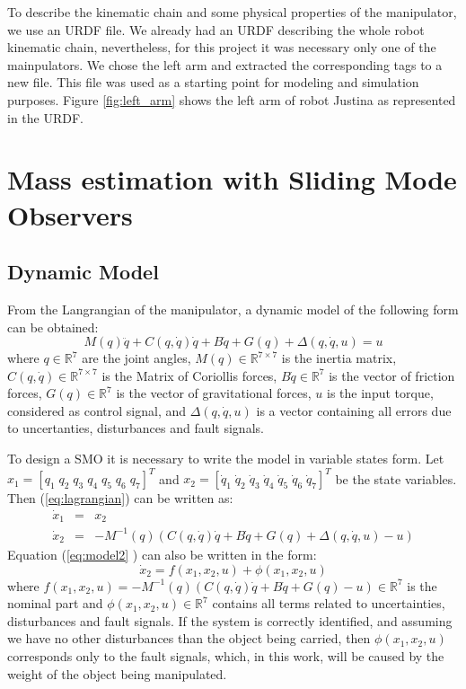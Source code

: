 \documentclass[a4paper, 10pt]{article}
\begin{document}
To describe the kinematic chain and some physical properties of the manipulator, we use an URDF file. We already had an URDF describing the whole robot kinematic chain, nevertheless, for this project it was necessary only one of the mainpulators. We chose the left arm and extracted the corresponding tags to a new file. This file was used as a starting point for modeling and simulation purposes. Figure \ref{fig:left_arm} shows the left arm of robot Justina as represented in the URDF.

\section{Mass estimation with Sliding Mode Observers}

\subsection{Dynamic Model}
  From the Langrangian of the manipulator, a dynamic model of the following form can be obtained:
  \begin{equation}
    M(q)\ddot{q} + C(q, \dot{q})\dot{q} + B\dot{q} + G(q) + \Delta(q,\dot{q}, u) = u
    \label{eq:lagrangian}
  \end{equation}
  where $q\in \mathbb{R}^7$ are the joint angles, $M(q)\in \mathbb{R}^{7\times 7}$ is the inertia matrix, $C(q,\dot{q})\in \mathbb{R}^{7\times 7}$ is the Matrix of Coriollis forces, $B\dot{q}\in \mathbb{R}^7$ is the vector of friction forces, $G(q)\in\mathbb{R}^7$ is the vector of gravitational forces, $u$ is the input torque, considered as control signal, and $\Delta(q,\dot{q},u)$ is a vector containing all errors due to uncertanties, disturbances and fault signals.
  
  To design a SMO it is necessary to write the model in variable states form. Let $x_1 = [q_1\;q_2\;q_3\;q_4\;q_5\;q_6\;q_7]^T$ and $x_2 = [\dot{q}_1\;\dot{q}_2\;\dot{q}_3\;\dot{q}_4\;\dot{q}_5\;\dot{q}_6\;\dot{q}_7]^T$ be the state variables. Then (\ref{eq:lagrangian}) can be written as:
  \begin{eqnarray}
    \dot{x}_1 &=& x_2\label{eq:model1}\\
    \dot{x}_2 &=& -M^{-1}(q)\left(C(q, \dot{q})\dot{q} + B\dot{q} + G(q) + \Delta(q,\dot{q},u) - u\right)\label{eq:model2}
  \end{eqnarray}
Equation (\ref{eq:model2} ) can also be written in the form:
  \begin{equation*}
    \dot{x}_2 = f(x_1, x_2, u) + \phi(x_1, x_2, u)
  \end{equation*}
  where $f(x_1, x_2, u) = -M^{-1}(q)\left(C(q, \dot{q})\dot{q} + B\dot{q} + G(q) - u\right) \in \mathbb{R}^7$ is the nominal part and $\phi(x_1, x_2, u) \in \mathbb{R}^7$ contains all terms related to uncertainties, disturbances and fault signals. If the system is correctly identified, and assuming we have no other disturbances than the object being carried, then $\phi(x_1, x_2, u)$ corresponds only to the fault signals, which, in this work, will be caused by the weight of the object being manipulated.
\end{document}

